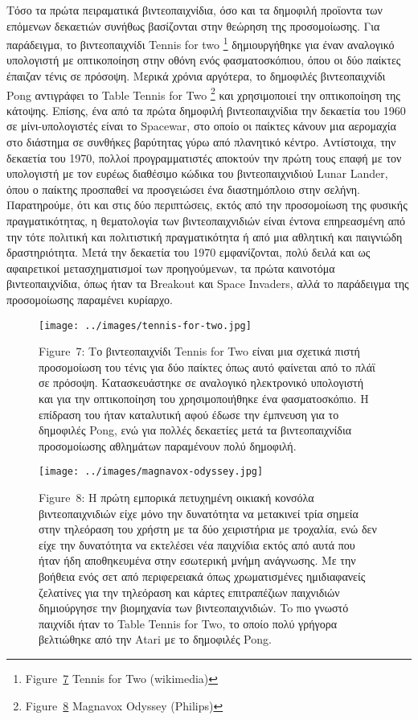 \documentclass[
]{article}
\begin{document}
Τόσο τα πρώτα πειραματικά βιντεοπαιχνίδια, όσο και τα δημοφιλή προϊοντα
των επόμενων δεκαετιών συνήθως βασίζονται στην θεώρηση της προσομοίωσης.
Για παράδειγμα, το βιντεοπαιχνίδι Tennis for two \footnote{Figure~\protect\hyperlink{fig:tennis-for-two}{7}
  Tennis for Two (wikimedia)} δημιουργήθηκε για έναν αναλογικό
υπολογιστή με οπτικοποίηση στην οθόνη ενός φασματοσκόπιου, όπου οι δύο
παίκτες έπαιζαν τένις σε πρόσοψη. Μερικά χρόνια αργότερα, το δημοφιλές
βιντεοπαιχνίδι Pong αντιγράφει το Table Tennis for Two \footnote{Figure~\protect\hyperlink{fig:magnavox-odyssey}{8}
  Magnavox Odyssey (Philips)} και χρησιμοποιεί την οπτικοποίηση της
κάτοψης. Επίσης, ένα από τα πρώτα δημοφιλή βιντεοπαιχνίδια την δεκαετία
του 1960 σε μίνι-υπολογιστές είναι το Spacewar, στο οποίο οι παίκτες
κάνουν μια αερομαχία στο διάστημα σε συνθήκες βαρύτητας γύρω από
πλανητικό κέντρο. Αντίστοιχα, την δεκαετία του 1970, πολλοί
προγραμματιστές αποκτούν την πρώτη τους επαφή με τον υπολογιστή με τον
ευρέως διαθέσιμο κώδικα του βιντεοπαιχνιδιού Lunar Lander, όπου ο
παίκτης προσπαθεί να προσγειώσει ένα διαστημόπλοιο στην σελήνη.
Παρατηρούμε, ότι και στις δύο περιπτώσεις, εκτός από την προσομοίωση της
φυσικής πραγματικότητας, η θεματολογία των βιντεοπαιχνιδιών είναι έντονα
επηρεασμένη από την τότε πολιτική και πολιτιστική πραγματικότητα ή από
μια αθλητική και παιγνιώδη δραστηριότητα. Μετά την δεκαετία του 1970
εμφανίζονται, πολύ δειλά και ως αφαιρετικοί μετασχηματισμοί των
προηγούμενων, τα πρώτα καινοτόμα βιντεοπαιχνίδια, όπως ήταν τα Breakout
και Space Invaders, αλλά το παράδειγμα της προσομοίωσης παραμένει
κυρίαρχο.

\leavevmode{}%
\begin{figure}
\hypertarget{fig:tennis-for-two}{%
\centering
\texttt{[image: ../images/tennis-for-two.jpg]}
\caption{Figure~7: Το βιντεοπαιχνίδι Tennis for Two είναι μια σχετικά
πιστή προσομοίωση του τένις για δύο παίκτες όπως αυτό φαίνεται από το
πλάϊ σε πρόσοψη. Κατασκευάστηκε σε αναλογικό ηλεκτρονικό υπολογιστή και
για την οπτικοποίηση του χρησιμοποιήθηκε ένα φασματοσκόπιο. Η επίδραση
του ήταν καταλυτική αφού έδωσε την έμπνευση για το δημοφιλές Pong, ενώ
για πολλές δεκαετίες μετά τα βιντεοπαιχνίδια προσομοίωσης αθλημάτων
παραμένουν πολύ δημοφιλή.}\label{fig:tennis-for-two}
}
\end{figure}

\leavevmode{}%
\begin{figure}
\hypertarget{fig:magnavox-odyssey}{%
\centering
\texttt{[image: ../images/magnavox-odyssey.jpg]}
\caption{Figure~8: Η πρώτη εμπορικά πετυχημένη οικιακή κονσόλα
βιντεοπαιχνιδιών είχε μόνο την δυνατότητα να μετακινεί τρία σημεία στην
τηλεόραση του χρήστη με τα δύο χειριστήρια με τροχαλία, ενώ δεν είχε την
δυνατότητα να εκτελέσει νέα παιχνίδια εκτός από αυτά που ήταν ήδη
αποθηκευμένα στην εσωτερική μνήμη ανάγνωσης. Με την βοήθεια ενός σετ από
περιφερειακά όπως χρωματισμένες ημιδιαφανείς ζελατίνες για την τηλεόραση
και κάρτες επιτραπέζιων παιχνιδιών δημιούργησε την βιομηχανία των
βιντεοπαιχνιδιών. To πιο γνωστό παιχνίδι ήταν το Table Tennis for Two,
το οποίο πολύ γρήγορα βελτιώθηκε από την Atari με το δημοφιλές
Pong.}\label{fig:magnavox-odyssey}
}
\end{figure}
\end{document}
